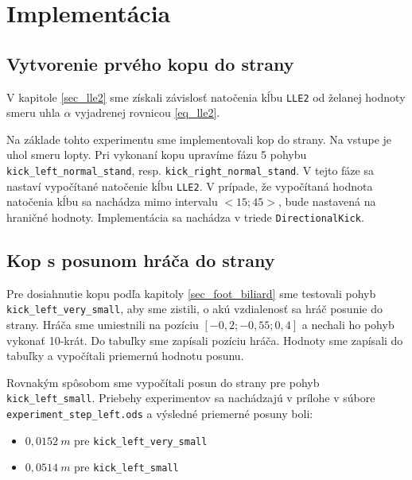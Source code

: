 \section{Implementácia} \label{sec_kick_implementation}

\subsection{Vytvorenie prvého kopu do strany} \label{sec_lle2_kick_impl}

V kapitole \ref{sec_lle2} sme získali závislosť natočenia kĺbu \texttt{LLE2} od želanej hodnoty smeru uhla $\alpha$ vyjadrenej rovnicou \ref{eq_lle2}. 

Na základe tohto experimentu sme implementovali kop do strany. Na vstupe je uhol smeru lopty. Pri vykonaní kopu upravíme fázu 5 pohybu 
\newline\texttt{kick\_left\_normal\_stand}, resp. \texttt{kick\_right\_normal\_stand}. V tejto fáze sa nastaví vypočítané natočenie kĺbu \texttt{LLE2}. V prípade, že vypočítaná hodnota natočenia kĺbu sa nachádza mimo intervalu $<15;45>$, bude nastavená na hraničné hodnoty. Implementácia sa nachádza v triede \texttt{DirectionalKick}.

\subsection{Kop s posunom hráča do strany} \label{sec_kick_step_impl}

Pre dosiahnutie kopu podľa kapitoly \ref{sec_foot_biliard} sme testovali pohyb \newline\texttt{kick\_left\_very\_small}, aby sme zistili, o akú vzdialenosť sa hráč posunie do strany. Hráča sme umiestnili na pozíciu $[-0,2; -0,55; 0,4]$ a nechali ho pohyb vykonať 10-krát. Do tabuľky sme zapísali pozíciu hráča. Hodnoty sme zapísali do tabuľky a vypočítali priemernú hodnotu posunu. 

Rovnakým spôsobom sme vypočítali posun do strany pre pohyb \newline\texttt{kick\_left\_small}. Priebehy experimentov sa nachádzajú v prílohe v súbore \newline\texttt{experiment\_step\_left.ods} a výsledné priemerné posuny boli:
\begin{itemize}
	\item $0,0152~m$ pre \texttt{kick\_left\_very\_small}
	\item $0,0514~m$ pre \texttt{kick\_left\_small}
\end{itemize}

